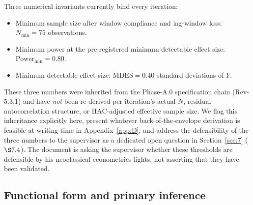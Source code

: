 Three numerical invariants currently bind every iteration:

\begin{itemize}
  \item Minimum sample size after window compliance and lag-window loss:
    \(N_{\min} = 75\) observations.
  \item Minimum power at the pre-registered minimum detectable effect size:
    \(\mathrm{Power}_{\min} = 0.80\).
  \item Minimum detectable effect size: \(\mathrm{MDES} = 0.40\) standard
    deviations of \(Y\).
\end{itemize}

These three numbers were inherited from the Phase-A.0 specification chain
(Rev-5.3.1) and have \emph{not} been re-derived per iteration's actual
\(N\), residual autocorrelation structure, or HAC-adjusted effective sample
size. We flag this inheritance explicitly here, present whatever
back-of-the-envelope derivation is feasible at writing time in
Appendix~\ref{app:D}, and address the defensibility of the three numbers
to the supervisor as a dedicated open question in Section~\ref{sec:7}
(\(\S 7.4\)). The document is asking the supervisor whether these
thresholds are defensible by his neoclassical-econometrics lights, not
asserting that they have been validated.

\subsection{Functional form and primary inference}\label{sec:5.3}

